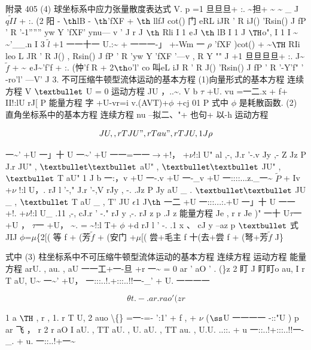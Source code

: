 附录 405 (4) 球坐标系中应力张量散度表达式 V. p =1 旦旦旦+ :. \textasciitilde{}担+ \textasciitilde{} \textasciitilde{} \_ J $\tilde{qII}$ + :. (2 阳 - ${\rm þ}$lB - ${\rm þ}$'fXF + ${\rm þ}$ llfJ cot() 门 eRL iJR ' R iJ() 'Rsin() J fP ' R '-1'''''' yw Y 'fXF' ynu--- v ' J r J ${\rm þ}$ Rli I 1 ${\rm e}$J ${\rm þ}$ lB I 1 J ${\rm Þ}$o", I 1 I \textasciitilde{} \textasciitilde{}'\_\_.n I 3 $\tilde{l}$ +1 一一十一 U.:\textasciitilde{} + 一一一-」 +-Wm 一 $\rho$ 'fXF )cot() + \textasciitilde{}${\rm Þ}$ RIi leo L JR ' R J() , Rsin() J fP ' R 'yw Y 'fXF '---v , R Y "" J +1 旦旦旦旦+ :. J\textasciitilde{}$\tilde{f}$ + \textasciitilde{} ${\rm e}$J\textasciitilde{}'f'f + :. (忡'f R + 2${\rm þ}$o'l' co 叫eL iJ R ' R J() 'Rsin() J fP ' R '-Y'f" ' -ro'l' ---V' J 3. 不可压缩牛顿型流体运动的基本方程 (1)向量形式的基本方程 连续方程 V ${\rm •}$ U = 0 运动方程 JU ，..\textasciitilde{}. V b $\tau$ +U. vu =一二.x + f+ II!:lU rJ[ P 能量方程 字 +U-vr=i v.(AVT)+$\phi$ +cj 01 P 式中 $\phi$ 是耗散函数. (2) 直角坐标系中的基本方程 连续方程 nu --拟二、"+ 也句+ 以-h 运动方程

\[JU, , rT JU" , rT au" , rT JU , 1 J\rho \]

一\textasciitilde{}' +U 一」十 U 一\textasciitilde{}' +U 一一=一一$\rightarrow$+!， +$\nu$!:l U" al ,-, J.r '-.v Jy ,- Z Jz P J.r JU" , ${\rm ••}$ aU" , ${\rm ••}$ JU" , ${\rm •}$ T aU" 1 J b 一:，v +U 一-.v +U 一-\_v +U 一::::...z.\_一\textasciitilde{} $\tilde{P}$ + Iv +$\nu$ !:l U，. rJ l '-," J.r '-,V rJy , -. .Jz P Jy aU \_ . ${\rm ••}$ JU \_ , ${\rm •}$ T aU \_ , T' JU $\epsilon$1 J${\rm þ}$ 一二 +U 一:::...:.+U 一」十 U 一一 +!. +$\nu$!:l U\_ .11 ,-, cJ.r ' -." rJ y ,-. rJ z p .J z 能量方程 Je , r r Je )" 一十 U$\tau$一 +U ， $\tau$一 +U， \textasciitilde{}. = \textasciitilde{}!:l T+ $\phi$ +d rJ l ' -. .1 x 、 cJ y --az p ${\rm •}$ 式 JIJ $\phi$=$\mu$\{2[( 等 f + (芳$\tilde{f}$ + (安门 +$\mu$[( 尝+毛主 f 十(去+尝 f + (弩+芳$\tilde{f}$ J\}

式中 (3) 柱坐标系中不可压缩牛顿型流体运动的基本方程 连续方程 运动方程 能量方程 arU. , au. , aU 一一工+一-旦 +r 一\textasciitilde{} = 0 ar ' aO ' . (\}z 2 盯 J 盯盯o au, I r T aU, U\textasciitilde{} 一\textasciitilde{}' +U， 一:::..!.+:::..!!一-\_' + U. 一一一一

\[\theta  t . -. ar . r ao ' (z r\]

1 a ${\rm Þ}$ , r , 1. r T U, 2 auo \textbackslash\{\} =一-=- ':1' + f , + $\nu$ (${\rm ß}$U 一一一一 -::"U ) p ar 飞 ， r 2 r aO I aU. , TT aU. , U. aU. , TT au. , U.U. ..::. + u 一::..!+:::..!!一-\_. + u. 一::..!+一\textasciitilde{}

